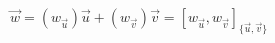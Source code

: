 \documentclass[preview]{standalone}
\begin{document}
\begin{align*}
\vec{w} = (w_{\vec{u}}) \vec{u} + (w_{\vec{v}}) \vec{v} = [w_{\vec{u}},w_{\vec{v}}]_{\{\vec{u},\vec{v}\}}
\end{align*}
\end{document}
